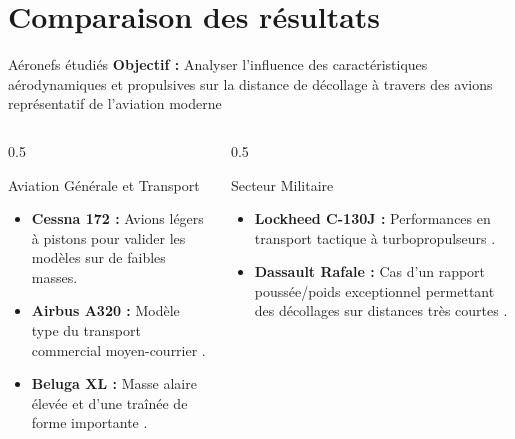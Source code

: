 \section{Comparaison des résultats}

	
	\begin{frame}{Aéronefs étudiés}
		\textbf{Objectif :} Analyser l'influence des caractéristiques aérodynamiques et propulsives sur la distance de décollage à travers des avions représentatif de l'aviation moderne 
			
		\begin{columns}[t]
			\begin{column}{0.5\textwidth}
				\begin{block}{Aviation Générale et Transport}
					\begin{itemize}
						\item \textbf{Cessna 172 :} Avions légers à pistons pour valider les modèles sur de faibles masses.
						\item \textbf{Airbus A320 :} Modèle type du transport commercial moyen-courrier .
						\item \textbf{Beluga XL :} Masse alaire élevée et d'une traînée de forme importante .
					\end{itemize}
				\end{block}
			\end{column}
			
			\begin{column}{0.5\textwidth}
				\begin{block}{Secteur Militaire}
					\begin{itemize}
						\item \textbf{Lockheed C-130J :} Performances en transport tactique à turbopropulseurs .
						\item \textbf{Dassault Rafale :} Cas d'un rapport poussée/poids exceptionnel permettant des décollages sur distances très courtes .
					\end{itemize}
				\end{block}
			\end{column}
		\end{columns}
		
	
	\end{frame}
	
	
	
	
